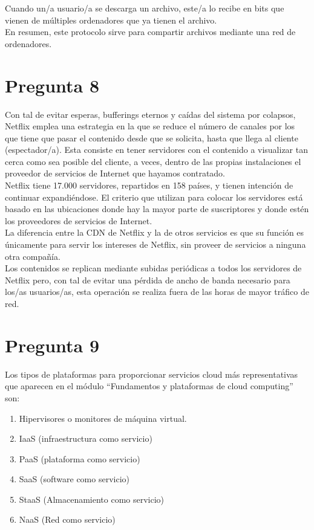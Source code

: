 \documentclass[spanish]{article}
\begin{document}
Cuando un/a usuario/a se descarga un archivo, este/a lo
recibe en bits que vienen de múltiples ordenadores que ya
tienen el archivo.\\

En resumen, este protocolo sirve para compartir archivos
mediante una red de ordenadores.

\section{Pregunta 8}

Con tal de evitar esperas, bufferings eternos y caídas del
sistema por colapsos, Netflix emplea una estrategia en la
que se reduce el número de canales por los que tiene que
pasar el contenido desde que se solicita, hasta que llega al
cliente (espectador/a). Esta consiste en tener servidores
con el contenido a visualizar tan cerca como sea posible del
cliente, a veces, dentro de las propias instalaciones el
proveedor de servicios de Internet que hayamos contratado.\\

Netflix tiene 17.000 servidores, repartidos en 158 países, y
tienen intención de continuar expandiéndose. El criterio que
utilizan para colocar los servidores está basado en las
ubicaciones donde hay la mayor parte de suscriptores y donde
estén los proveedores de servicios de Internet.\\

La diferencia entre la CDN de Netflix y la de otros
servicios es que su función es únicamente para servir los
intereses de Netflix, sin proveer de servicios a ninguna
otra compañía.\\

Los contenidos se replican mediante subidas periódicas a
todos los servidores de Netflix pero, con tal de evitar una
pérdida de ancho de banda necesario para los/as usuarios/as,
esta operación se realiza fuera de las horas de mayor
tráfico de red.\\

\newpage

\section{Pregunta 9}

Los tipos de plataformas para proporcionar servicios cloud
más representativas que aparecen en el módulo ``Fundamentos
y plataformas de cloud computing'' son:

\begin{enumerate}
\item Hipervisores o monitores de máquina virtual.
\item IaaS (infraestructura como servicio)
\item PaaS (plataforma como servicio)
\item SaaS (software como servicio)
\item StaaS (Almacenamiento como servicio)
\item NaaS (Red como servicio)
\end{enumerate}
\end{document}
